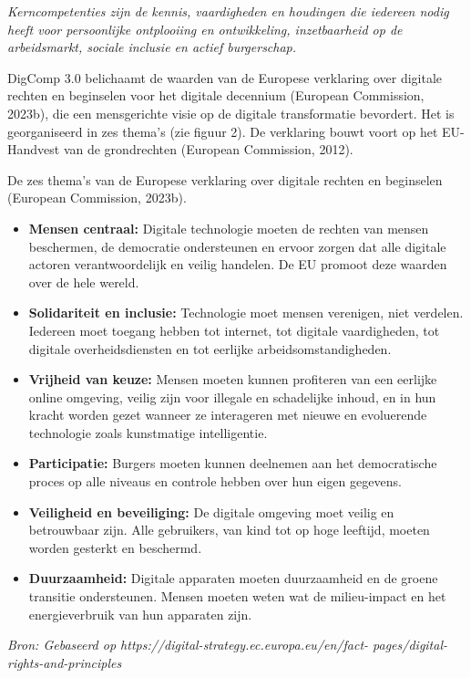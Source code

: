 \documentclass[
  dutch,
  letterpaper,
  DIV=11,
  numbers=noendperiod]{scrartcl}
\begin{document}
\emph{Kerncompetenties zijn de kennis, vaardigheden en houdingen die
iedereen nodig heeft voor persoonlijke ontplooiing en ontwikkeling,
inzetbaarheid op de arbeidsmarkt, sociale inclusie en actief
burgerschap.}

DigComp 3.0 belichaamt de waarden van de Europese verklaring over
digitale rechten en beginselen voor het digitale decennium (European
Commission, 2023b), die een mensgerichte visie op de digitale
transformatie bevordert. Het is georganiseerd in zes thema's (zie figuur
2). De verklaring bouwt voort op het EU-Handvest van de grondrechten
(European Commission, 2012).

De zes thema's van de Europese verklaring over digitale rechten en
beginselen (European Commission, 2023b).

\begin{itemize}
\item
  \textbf{Mensen centraal:} Digitale technologie moeten de rechten van
  mensen beschermen, de democratie ondersteunen en ervoor zorgen dat
  alle digitale actoren verantwoordelijk en veilig handelen. De EU
  promoot deze waarden over de hele wereld.
\item
  \textbf{Solidariteit en inclusie:} Technologie moet mensen verenigen,
  niet verdelen. Iedereen moet toegang hebben tot internet, tot digitale
  vaardigheden, tot digitale overheidsdiensten en tot eerlijke
  arbeidsomstandigheden.
\item
  \textbf{Vrijheid van keuze:} Mensen moeten kunnen profiteren van een
  eerlijke online omgeving, veilig zijn voor illegale en schadelijke
  inhoud, en in hun kracht worden gezet wanneer ze interageren met
  nieuwe en evoluerende technologie zoals kunstmatige intelligentie.
\item
  \textbf{Participatie:} Burgers moeten kunnen deelnemen aan het
  democratische proces op alle niveaus en controle hebben over hun eigen
  gegevens.
\item
  \textbf{Veiligheid en beveiliging:} De digitale omgeving moet veilig
  en betrouwbaar zijn. Alle gebruikers, van kind tot op hoge leeftijd,
  moeten worden gesterkt en beschermd.
\item
  \textbf{Duurzaamheid:} Digitale apparaten moeten duurzaamheid en de
  groene transitie ondersteunen. Mensen moeten weten wat de
  milieu-impact en het energieverbruik van hun apparaten zijn.
\end{itemize}

\emph{Bron: Gebaseerd op https://digital-strategy.ec.europa.eu/en/fact-
pages/digital-rights-and-principles}
\end{document}
